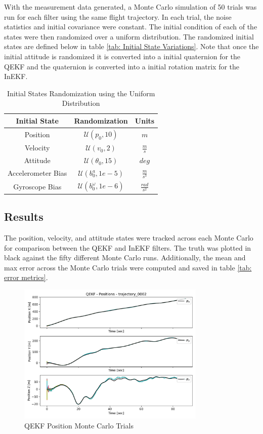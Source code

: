With the measurement data generated, a Monte Carlo simulation of 50 trials was run for each filter using the same flight trajectory. In each trial, the noise statistics and initial covariance were constant. The initial condition of each of the states were then randomized over a uniform distribution. The randomized initial states are defined below in table \eqref{tab: Initial State Variations}. Note that once the initial attitude is randomized it is converted into a initial quaternion for the QEKF and the quaternion is converted into a initial rotation matrix for the InEKF.

\begin{table}[H]
\centering
\begin{tabular}{|c|c|c|}
\hline
\textbf{Initial State} & \textbf{Randomization} & \textbf{Units} \\ 
\hline
Position  & $\mathcal{U}(p_0, 10) $ & $m$ \\ 
\hline
Velocity & $\mathcal{U}(v_0, 2)$ & $\frac{m}{s}$ \\ 
\hline
Attitude & $\mathcal{U}(\theta_0, 15)$ & $deg$\\ 
\hline
Accelerometer Bias & $\mathcal{U}(b^{a}_0, 1e-5)$ & $\frac{m}{s^3}$\\ 
\hline
Gyroscope Bias & $\mathcal{U}(b^{\omega}_0, 1e-6)$ & $\frac{rad}{s^2}$\\ 
\hline
\end{tabular}
\caption{Initial States Randomization using the Uniform Distribution}
\label{tab: Initial State Variations}
\end{table}


\subsection{Results}

The position, velocity, and attitude states were tracked across each Monte Carlo for comparison between the QEKF and InEKF filters. The truth was plotted in black against the fifty different Monte Carlo runs. Additionally, the mean and max error across the Monte Carlo trials were computed and saved in table \eqref{tab: error metrics}.

\begin{figure}[H]
    \centering
    \includegraphics[width=0.8\textwidth]{figs/QEKF_trajectory_0002_positions.pdf}
    \caption{QEKF Position Monte Carlo Trials}
    \label{fig: QEKF Position Monte Carlo Trials}
\end{figure}

